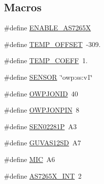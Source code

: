 \subsection*{Macros}
\begin{DoxyCompactItemize}
\item 
\#define \hyperlink{OWP__DG__SensorStation_8ino_a5cab8e4f33c1902fddcd23dd526dbc7a}{E\-N\-A\-B\-L\-E\-\_\-\-A\-S7265\-X}
\item 
\#define \hyperlink{OWP__DG__SensorStation_8ino_a3cb24f09004f92185b77e9e7bac6ea61}{T\-E\-M\-P\-\_\-\-O\-F\-F\-S\-E\-T}~-\/309.
\item 
\#define \hyperlink{OWP__DG__SensorStation_8ino_ab667d793bed5c1fb5503624b0ab7504a}{T\-E\-M\-P\-\_\-\-C\-O\-E\-F\-F}~1.
\item 
\#define \hyperlink{OWP__DG__SensorStation_8ino_a84f1ead330bbcc83a63929c4726080d7}{S\-E\-N\-S\-O\-R}~\char`\"{}owp\-:ss\-:v1\char`\"{}
\item 
\#define \hyperlink{OWP__DG__SensorStation_8ino_aff6283040066cbe0e6d17cbcd83abffc}{O\-W\-P\-J\-O\-N\-I\-D}~40
\item 
\#define \hyperlink{OWP__DG__SensorStation_8ino_a56e661b1bfea8fcdd1bc25c6cdfe2a73}{O\-W\-P\-J\-O\-N\-P\-I\-N}~8
\item 
\#define \hyperlink{OWP__DG__SensorStation_8ino_aefa70dbae098252447aae93b45b4ea2c}{S\-E\-N02281\-P}~A3
\item 
\#define \hyperlink{OWP__DG__SensorStation_8ino_a3a0bfe3da093e16e22254f7fe75b080e}{G\-U\-V\-A\-S12\-S\-D}~A7
\item 
\#define \hyperlink{OWP__DG__SensorStation_8ino_a6636551bd86d7647ce3e09781b4d5e4e}{M\-I\-C}~A6
\item 
\#define \hyperlink{OWP__DG__SensorStation_8ino_a769364352155d64fe2171026cb0d0714}{A\-S7265\-X\-\_\-\-I\-N\-T}~2
\end{DoxyCompactItemize}
